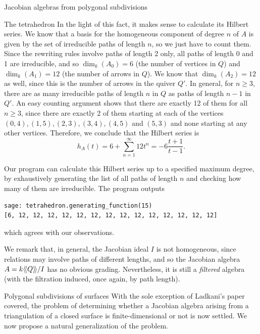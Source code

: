 \begin{chapter}{Jacobian algebras from polygonal subdivisions}
\begin{section}{The tetrahedron}
In the light of this fact, it makes sense to calculate its Hilbert series. We know that a basis for the homogeneous component of degree $n$ of $A$ is given by the set of irreducible paths of length $n$, so we just have to count them. Since the rewriting rules involve paths of length 2 only, all paths of length 0 and 1 are irreducible, and so $\dim_k(A_0)=6$ (the number of vertices in $Q$) and $\dim_k(A_1)=12$ (the number of arrows in $Q$). We know that $\dim_k(A_2)=12$ as well, since this is the number of arrows in the quiver $Q'$. In general, for $n\geq 3$, there are as many irreducible paths of length $n$ in $Q$ as paths of length $n-1$ in $Q'$. An easy counting argument shows that there are exactly 12 of them for all $n\geq 3$, since there are exactly 2 of them starting at each of the vertices $(0,4),(1,5), (2,3), (3,4), (4,5)$ and $(5,3)$ and none starting at any other vertices. Therefore, we conclude that the Hilbert series is
\[h_A(t)=6+\sum_{n=1}^\infty 12 t^n=-6\frac{t+1}{t-1}.\]

Our program can calculate this Hilbert series up to a specified maximum degree, by exhaustively generating the list of all paths of length $n$ and checking how many of them are irreducible. The program outputs
\begin{lstlisting}
sage: tetrahedron.generating_function(15)
[6, 12, 12, 12, 12, 12, 12, 12, 12, 12, 12, 12, 12, 12, 12]
\end{lstlisting}
which agrees with our observations.

\label{graded-alg}We remark that, in general, the Jacobian ideal $I$ is not homogeneous, since relations may involve paths of different lengths, and so the Jacobian algebra $A=k\langle\!\langle Q\rangle\!\rangle/I$ has no obvious grading. Nevertheless, it is still a \emph{filtered} algebra (with the filtration induced, once again, by path length). %
\end{section}

\begin{section}{Polygonal subdivisions of surfaces}
With the sole exception of Ladkani's paper covered, the problem of determining whether a Jacobian algebra arising from a triangulation of a closed surface is finite-dimensional or not is now settled. We now propose a natural generalization of the problem.


\end{section}
\end{chapter}
